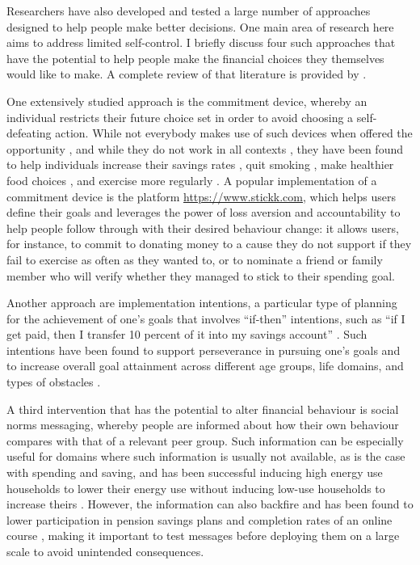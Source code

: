 Researchers have also developed and tested a large number of approaches
designed to help people make better decisions. One main area of research here
aims to address limited self-control. I briefly discuss four such approaches
that have the potential to help people make the financial choices they
themselves would like to make. A complete review of that literature is provided
by \citet{duckworth2018beyond}.

One extensively studied approach is the commitment device, whereby an
individual restricts their future choice set in order to avoid choosing a
self-defeating action. While not everybody makes use of such devices when
offered the opportunity \citep{bryan2010commitment}, and while they do not work
in all contexts \citep{laibson2015don,robinson2018some}, they have been found
to help individuals increase their savings rates \citep{ashraf2006tying}, quit
smoking \citep{gine2010put}, make healthier food choices
\citep{schwartz2014healthier}, and exercise more regularly
\citep{royer2015incentives}. A popular implementation of a commitment device is
the platform \href{stickk.com}{https://www.stickk.com}, which helps users
define their goals and leverages the power of loss aversion and accountability
to help people follow through with their desired behaviour change: it allows
users, for instance, to commit to donating money to a cause they do not support
if they fail to exercise as often as they wanted to, or to nominate a friend or
family member who will verify whether they managed to stick to their spending
goal.

Another approach are implementation intentions, a particular type of planning
for the achievement of one's goals that involves ``if-then'' intentions, such as
``if I get paid, then I transfer 10 percent of it into my savings account''
\citep{gollwitzer2006implementation, rogers2015beyond}. Such intentions have
been found to support perseverance in pursuing one's goals
\citep{oettingen2010strategies} and to increase overall goal attainment across
different age groups, life domains, and types of obstacles
\citep{gollwitzer2006implementation}.

A third intervention that has the potential to alter financial behaviour is
social norms messaging, whereby people are informed about how their own
behaviour compares with that of a relevant peer group. Such information can be
especially useful for domains where such information is usually not available,
as is the case with spending and saving, and has been successful inducing high
energy use households to lower their energy use without inducing low-use
households to increase theirs \citep{schultz2007constructive,
allcott2011social, allcott2014short, brandon2017effects}. However, the
information can also backfire and has been found to lower participation in
pension savings plans \citep{beshears2015effect} and completion rates of an
online course \citep{rogers2016discouraged}, making it important to test
messages before deploying them on a large scale to avoid unintended
consequences.

